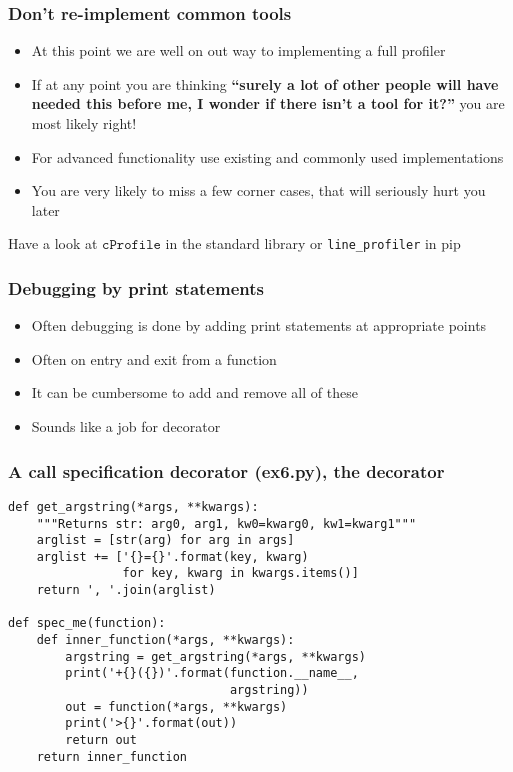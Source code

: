 \documentclass{beamer}
\begin{document}
\begin{frame}
  \frametitle{Don't re-implement common tools}
  \begin{itemize}
  \item At this point we are well on out way to implementing a full profiler
  \item If at any point you are thinking \textbf{``surely a lot of
      other people will have needed this before me, I wonder if there
      isn't a tool for it?''} you are most likely right!
  \item {\color{darkred}For advanced functionality use existing and
      commonly used implementations}
  \item {\color{black}}You are very likely to miss a few corner cases,
    that will seriously hurt you later
  \end{itemize}
  \begin{block}{\vspace*{-3ex}}
    Have a look at $\texttt{cProfile}$ in the standard library or
    \texttt{line\_profiler} in pip
  \end{block}
\end{frame}

\begin{frame}
  \frametitle{Debugging by print statements}
  \begin{itemize}
  \item Often debugging is done by adding print statements at appropriate
    points
  \item Often on entry and exit from a function
  \item It can be cumbersome to add and remove all of these
  \item Sounds like a job for decorator
  \end{itemize}
\end{frame}

\begin{frame}[fragile]
  \frametitle{A call specification decorator (ex6.py), the decorator}
\begin{verbatim}
def get_argstring(*args, **kwargs):
    """Returns str: arg0, arg1, kw0=kwarg0, kw1=kwarg1"""
    arglist = [str(arg) for arg in args]
    arglist += ['{}={}'.format(key, kwarg)
                for key, kwarg in kwargs.items()]
    return ', '.join(arglist)

def spec_me(function):
    def inner_function(*args, **kwargs):
        argstring = get_argstring(*args, **kwargs)
        print('+{}({})'.format(function.__name__,
                               argstring))
        out = function(*args, **kwargs)
        print('>{}'.format(out))
        return out
    return inner_function
\end{verbatim}
\end{frame}
\end{document}
